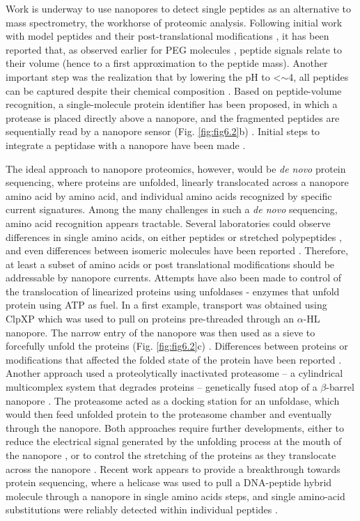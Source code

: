 Work is underway to use nanopores to detect single peptides as an alternative to mass spectrometry, the workhorse of proteomic analysis. Following initial work with model peptides \cite{Sutherland2004} and their post-translational modifications \cite{Restrepo-Perez2019}, it has been reported that, as observed earlier for PEG molecules \cite{Robertson2007}, peptide signals relate to their volume \cite{Chavis2017} (hence to a first approximation to the peptide mass). Another important step was the realization that by lowering the pH to <$\sim$4, all peptides can be captured despite their chemical composition \cite{Huang2017a}. Based on peptide-volume recognition, a single-molecule protein identifier has been proposed, in which a protease is placed directly above a nanopore, and the fragmented peptides are sequentially read by a nanopore sensor (Fig. \ref{fig:fig6.2}b) \cite{Huang2019a}. Initial steps to integrate a peptidase with a nanopore have been made \cite{Zhang2020}.


The ideal approach to nanopore proteomics, however, would be \emph{de novo} protein sequencing, where proteins are unfolded, linearly translocated across a nanopore amino acid by amino acid, and individual amino acids recognized by specific current signatures. Among the many challenges in such a \emph{de novo} sequencing, amino acid recognition appears tractable. Several laboratories could observe differences in single amino acids, on either peptides \cite{Ouldali2020} or stretched polypeptides \cite{Restrepo-Perez2019a}, and even differences between isomeric molecules have been reported \cite{Boersma2012}. Therefore, at least a subset of amino acids or post translational modifications should be addressable by nanopore currents. Attempts have also been made to control of the translocation of linearized proteins using unfoldases - enzymes that unfold protein using ATP as fuel. In a first example, transport was obtained using ClpXP which was used to pull on proteins pre-threaded through an $\alpha$-HL nanopore. The narrow entry of the nanopore was then used as a sieve to forcefully unfold the proteins (Fig. \ref{fig:fig6.2}c) \cite{Nivala2013}. Differences between proteins or modifications that affected the folded state of the protein have been reported \cite{Nivala2014}. Another approach used a proteolytically inactivated proteasome – a cylindrical multicomplex system that degrades proteins – genetically fused atop of a $\beta$-barrel nanopore \cite{Zhang2020}. The proteasome acted as a docking station for an unfoldase, which would then feed unfolded protein to the proteasome chamber and eventually through the nanopore. Both approaches require further developments, either to reduce the electrical signal generated by the unfolding process at the mouth of the nanopore \cite{Nivala2014}, or to control the stretching of the proteins as they translocate across the nanopore \cite{Zhang2020}. Recent work appears to provide a breakthrough towards protein sequencing, where a helicase was used to pull a DNA-peptide hybrid molecule through a nanopore in single amino acids steps, and single amino-acid substitutions were reliably detected within individual peptides \cite{Brinkerhoff2021}.


